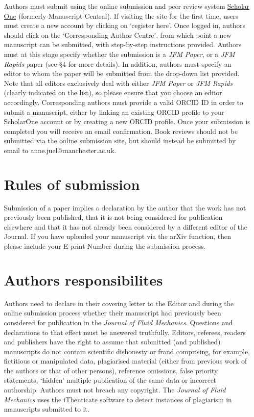 \documentclass[lineno]{jfm}
\begin{document}
 Authors must submit using the online submission and peer review system \href{https://mc.manuscriptcentral.com/jfm} {Scholar One} (formerly Manuscript Central). If visiting the site for the first time, users must create a new account by clicking on `register here'. Once logged in, authors should click on the `Corresponding Author Centre', from which point a new manuscript can be submitted, with step-by-step instructions provided. Authors must at this stage specify whether the submission is a {\it JFM Paper}, or a {\it JFM Rapids} paper (see \S4 for more details). In addition, authors must specify an editor to whom the paper will be submitted from the drop-down list provided. Note that all editors exclusively deal with either {\it JFM Paper} or {\it JFM Rapids} (clearly indicated on the list), so please ensure that you choose an editor accordingly. Corresponding authors must provide a valid ORCID ID in order to submit a manuscript, either by linking an existing ORCID profile to your ScholarOne account or by creating a new ORCID profile. Once your submission is completed you will receive an email confirmation. Book reviews should not be submitted via the online submission site, but should instead be submitted by email to anne.juel@manchester.ac.uk.
%

\section{Rules of submission}\label{sec:rules_submission}
 Submission of a paper implies a declaration by the author that the work has not previously been published, that it is not being considered for publication elsewhere and that it has not already been considered by a different editor of the Journal.  If you have uploaded your manuscript via the arXiv function, then please include your E-print Number during the submission process.

\section {Authors responsibilites}
 Authors need to declare in their covering letter to the Editor and during the online submission process whether their manuscript had previously been considered for publication in the {\it Journal of Fluid Mechanics}.  Questions and declarations to that effect must be answered truthfully.
Editors, referees, readers and publishers have the right to assume that submitted (and published) manuscripts do not contain scientific dishonesty or fraud comprising, for example, fictitious or manipulated data, plagiarised material (either from previous work of the authors or that of other persons), reference omissions, false priority statements, `hidden' multiple publication of the same data or incorrect authorship.  Authors must not breach any copyright.  The {\it Journal of Fluid Mechanics} uses the iThenticate software to detect instances of plagiarism in manuscripts submitted to it.
\end{document}
